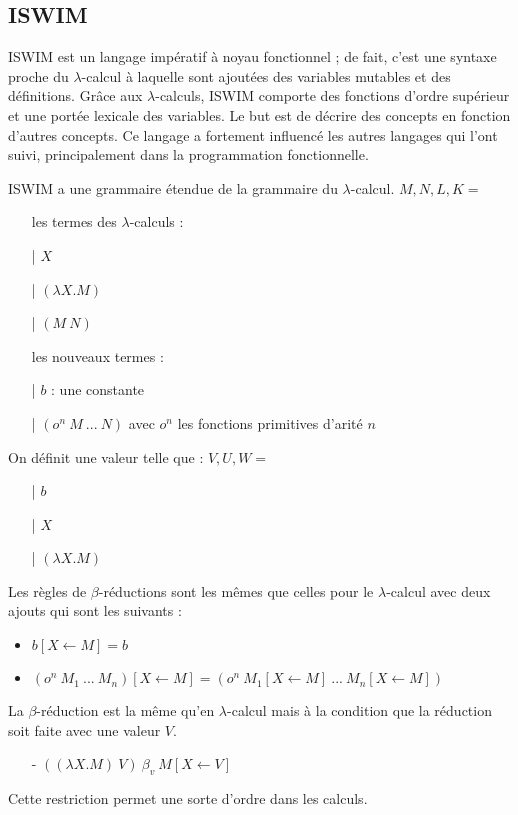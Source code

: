 \documentclass[10pt,a4paper]{report}
\begin{document}
	
	
	\subsection{ISWIM}	
	
	ISWIM est un langage impératif à noyau fonctionnel ; de fait, c'est une syntaxe proche du $\lambda$-calcul à laquelle sont ajoutées des variables mutables et des définitions. Grâce aux $\lambda$-calculs, ISWIM comporte des fonctions d'ordre supérieur et une portée lexicale des variables. Le but est de décrire des concepts en fonction d'autres concepts. Ce langage a fortement influencé les autres langages qui l'ont suivi, principalement dans la programmation fonctionnelle.
	\medbreak
	
	ISWIM a une grammaire étendue de la grammaire du $\lambda$-calcul.
	\smallbreak
	$M,N,L,K =$
	\begin{itemize}
		\item[ ] les termes des $\lambda$-calculs :
		\item[|] $X$ 
		\item[|] $(\lambda X.M)$
		\item[|] $(M~N)$
		\item[ ] les nouveaux termes :
		\item[|] $b$ : une constante
		\item[|] $(o^{n}~M~...~N)$ avec $o^{n}$ les fonctions primitives d'arité $n$
	\end{itemize}
	\medbreak
	
	On définit une valeur telle que :
	\smallbreak
	$V,U,W =$
	\begin{itemize}
		\item[|] $b$
		\item[|] $X$
		\item[|] $(\lambda X.M)$
	\end{itemize}
	\bigbreak
	
	
	Les règles de $\beta$-réductions sont les mêmes que celles pour le $\lambda$-calcul avec deux ajouts qui sont les suivants :
	\begin{itemize}
		\item $b[X \longleftarrow M] = b$
		\item $(o^{n}~M_{1}~...~M_{n})[X \longleftarrow M] = (o^{n}~M_{1}[X \longleftarrow M]~...~M_{n}[X \longleftarrow M])$
	\end{itemize}
	\bigbreak
	
	
	La $\beta$-réduction est la même qu'en $\lambda$-calcul mais à la condition que la réduction soit faite avec une valeur $V$. 
	\begin{itemize}
		\item[-] $((\lambda X.M)~V)~\beta_{v}~M[X \longleftarrow V]$
	\end{itemize} 
	\smallbreak
	Cette restriction permet une sorte d'ordre dans les calculs.
	\medbreak
	
\end{document}
